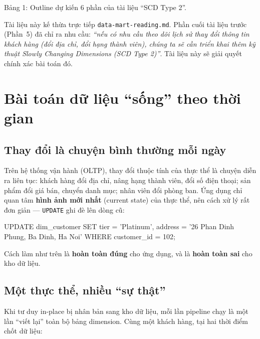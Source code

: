\documentclass[12pt]{article}
\begin{document}
\begin{captionbelowboxaivn}
Bảng 1: Outline dự kiến 6 phần của tài liệu ``SCD Type 2''.
\end{captionbelowboxaivn}

\begin{notebox}
Tài liệu này kế thừa trực tiếp \texttt{data-mart-reading.md}. Phần cuối tài liệu trước (Phần~5) đã chỉ ra nhu cầu: \emph{``nếu có nhu cầu theo dõi lịch sử thay đổi thông tin khách hàng (đổi địa chỉ, đổi hạng thành viên), chúng ta sẽ cần triển khai thêm kỹ thuật Slowly Changing Dimensions (SCD Type 2)''}. Tài liệu này sẽ giải quyết chính xác bài toán đó.
\end{notebox}

\section{Bài toán dữ liệu ``sống'' theo thời gian}

\subsection{Thay đổi là chuyện bình thường mỗi ngày}

Trên hệ thống vận hành (OLTP), thay đổi thuộc tính của thực thể là chuyện diễn ra liên tục: khách hàng đổi địa chỉ, nâng hạng thành viên, đổi số điện thoại; sản phẩm đổi giá bán, chuyển danh mục; nhân viên đổi phòng ban. Ứng dụng chỉ quan tâm \textbf{hình ảnh mới nhất} (current state) của thực thể, nên cách xử lý rất đơn giản --- \texttt{UPDATE} ghi đè lên dòng cũ:

\begin{aivnsqlbox}
UPDATE dim_customer
SET tier    = 'Platinum',
    address = '26 Phan Dinh Phung, Ba Dinh, Ha Noi'
WHERE customer_id = 102;
\end{aivnsqlbox}

Cách làm như trên là \textbf{hoàn toàn đúng} cho ứng dụng, và là \textbf{hoàn toàn sai} cho kho dữ liệu.

\subsection{Một thực thể, nhiều ``sự thật''}

Khi tư duy in-place bị nhân bản sang kho dữ liệu, mỗi lần pipeline chạy là một lần ``viết lại'' toàn bộ bảng dimension. Cùng một khách hàng, tại hai thời điểm chốt dữ liệu:
\end{document}
